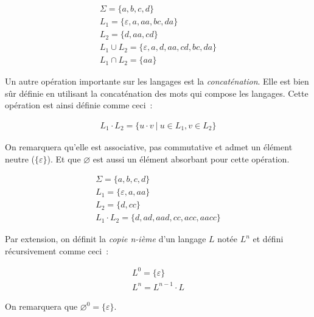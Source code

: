 \begin{example}
    \begin{gather*}
        \Sigma = \{a, b, c, d\} \\
        L_1 = \{\varepsilon, a, aa, bc, da\} \\
        L_2 = \{d, aa, cd\} \\
        L_1 \cup L_2 = \{\varepsilon, a, d, aa, cd, bc, da\} \\
        L_1 \cap L_2 = \{aa\}
    \end{gather*}
\end{example}

\begin{definition}
    Un autre opération importante sur les langages est la \textit{concaténation}.
    Elle est bien sûr définie en utilisant la concaténation des mots qui compose
    les langages. Cette opération est ainsi définie comme ceci~:

    \begin{gather*}
        L_1 \cdot L_2 = \{u \cdot v ~|~ u \in L_1, v \in L_2\}
    \end{gather*}

    \noindent On remarquera qu'elle est associative, pas commutative et admet un
    élément neutre (\(\{\varepsilon\}\)). Et que \(\varnothing\) est aussi un
    élément absorbant pour cette opération.
\end{definition}

\begin{example}
    \begin{gather*}
        \Sigma = \{a, b, c, d\} \\
        L_1 = \{\varepsilon, a, aa\} \\
        L_2 = \{d, cc\} \\
        L_1 \cdot L_2 = \{d, ad, aad, cc, acc, aacc\}
    \end{gather*}
\end{example}

\begin{definition}
    Par extension, on définit la \textit{copie n-ième} d'un langage \(L\) notée
    \(L^n\) et défini récursivement comme ceci~:

    \begin{gather*}
        L^0 = \{\varepsilon\} \\
        L^n = L^{n - 1} \cdot L
    \end{gather*}

    \noindent On remarquera que \(\varnothing^0 = \{\varepsilon\}\).
\end{definition}

